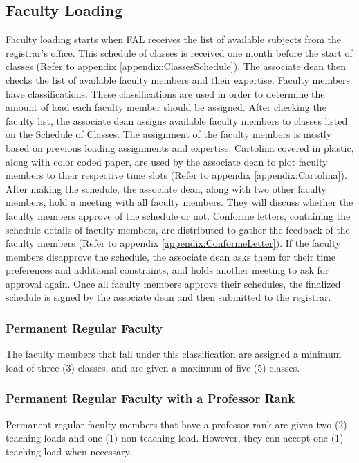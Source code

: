 \subsection{Faculty Loading}
Faculty loading starts when FAL receives the list of available subjects from the registrar's office. This schedule of classes is received one month before the start of classes (Refer to appendix \ref{appendix:ClassesSchedule}). The associate dean then checks the list of available faculty members and their expertise. Faculty members have classifications. These classifications are used in order to determine the amount of load each faculty member should be assigned. After checking the faculty list, the associate dean assigns available faculty members to classes listed on the Schedule of Classes. The assignment of the faculty members is mostly based on previous loading assignments and expertise. Cartolina covered in plastic, along with color coded paper, are used by the associate dean to plot faculty members to their respective time slots (Refer to appendix \ref{appendix:Cartolina}). After making the schedule, the associate dean, along with two other faculty members, hold a meeting with all faculty members. They will discuss whether the faculty members approve of the schedule or not. Conforme letters, containing the schedule details of faculty members, are distributed to gather the feedback of the faculty members (Refer to appendix \ref{appendix:ConformeLetter}). If the faculty members disapprove the schedule, the associate dean asks them for their time preferences and additional constraints, and holds another meeting to ask for approval again. Once all faculty members approve their schedules, the finalized schedule is signed by the associate dean and then submitted to the registrar.

\subsubsection{Permanent Regular Faculty}
The faculty members that fall under this classification are assigned a minimum load of three (3) classes, and are given a maximum of five (5) classes.

\subsubsection{Permanent Regular Faculty with a Professor Rank}
Permanent regular faculty members that have a professor rank are given two (2) teaching loads and one (1) non-teaching load. However, they can accept one (1) teaching load when necessary.

